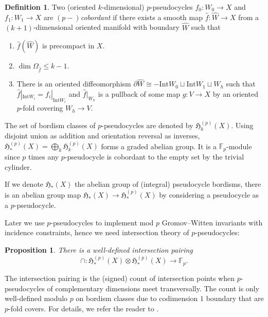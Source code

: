 \documentclass[reqno]{amsart}
\numberwithin{equation}{section}
\numberwithin{equation}{section}
\numberwithin{equation}{section}
\newtheorem{prop}[thm]{Proposition}
\theoremstyle{definition}
\newtheorem{defn}[thm]{Definition}
\theoremstyle{remark}
\theoremstyle{remark}
\begin{document}
\begin{defn}
    Two (oriented $k$-dimensional) $p$-pseudocycles $f_0: W_0 \to X$ and $f_1 : W_1 \to X$ are \emph{$(p-)$cobordant} if there exists a smooth map $\hat{f}: \hat{W} \to X$ from a $(k+1)$-dimensional oriented manifold with boundary $\hat{W}$ such that
    \begin{enumerate}
        \item $\hat{f}(\hat{W})$ is precompact in $X$.
        \item $\dim \Omega_{\hat{f}} \le k-1$.
        \item There is an oriented diffeomorphism $\partial \hat{W} \cong -\mathrm{Int} W_0 \sqcup \mathrm{Int} W_1 \sqcup W_h$ such that $\hat{f}|_{\mathrm{Int} W_i} = f_i |_{\mathrm{Int} W_i}$ and $\hat{f}|_{W_h}$ is a pullback of some map $g : V \to X$ by an oriented $p$-fold covering $W_h \to V$.
    \end{enumerate}
\end{defn}
The set of bordism classes of $p$-pseudocycles are denoted by $\mathfrak{H}_k^{(p)}(X)$. Using disjoint union as addition and orientation reversal as inverses, $\mathfrak{H}_*^{(p)}(X) = \bigoplus_k \mathfrak{H}_k^{(p)}(X)$ forms a graded abelian group. It is a $\mathbb{F}_p$-module since $p$ times any $p$-pseudocycle is cobordant to the empty set by the trivial cylinder. 

If we denote $\mathfrak{H}_*(X)$ the abelian group of (integral) pseudocycle bordisms, there is an abelian group map $\mathfrak{H}_*(X) \to \mathfrak{H}_*^{(p)}(X)$ by considering a pseudocycle as a $p$-pseudocycle. 


Later we use $p$-pseudocycles to implement mod $p$ Gromov--Witten invariants with incidence constraints, hence we need intersection theory of $p$-pseudocycles:
 
\begin{prop}
    There is a well-defined intersection pairing
    \begin{equation}
        \cap : \mathfrak{H}_*^{(p)}(X) \otimes \mathfrak{H}_*^{(p)}(X) \to \mathbb{F}_p.
    \end{equation}
\end{prop}
The intersection pairing is the (signed) count of intersection points when $p$-pseudocycles of complementary dimensions meet transversally. The count is only well-defined modulo $p$ on bordism classes due to codimension $1$ boundary that are $p$-fold covers. For details, we refer the reader to \cite[Appendix A]{bai-pomerleano-xu}.
\end{document}
